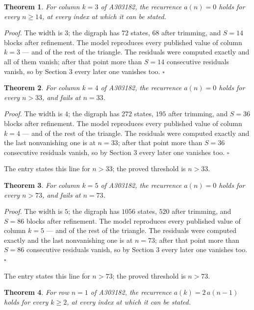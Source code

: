 \documentclass[11pt]{article}
\newtheorem{theorem}{Theorem}
\theoremstyle{definition}
\begin{document}
\begin{theorem} For column $k = 3$ of A303182, the recurrence $a(n) = 0$ holds for every $n \ge 14$, at every index at which it can be stated.\end{theorem}

{\itshape Proof.} The width is $3$; the digraph has $72$ states, $68$ after trimming, and $S = 14$ blocks after refinement. The model reproduces every published value of column $k = 3$ --- and of the rest of the triangle. The residuals were computed exactly and all of them vanish; after that point more than $S = 14$ consecutive residuals vanish, so by Section 3 every later one vanishes too. $\square$

\begin{theorem} For column $k = 4$ of A303182, the recurrence $a(n) = 0$ holds for every $n > 33$, and fails at $n = 33$.\end{theorem}

{\itshape Proof.} The width is $4$; the digraph has $272$ states, $195$ after trimming, and $S = 36$ blocks after refinement. The model reproduces every published value of column $k = 4$ --- and of the rest of the triangle. The residuals were computed exactly and the last nonvanishing one is at $n = 33$; after that point more than $S = 36$ consecutive residuals vanish, so by Section 3 every later one vanishes too. $\square$

The entry states this line for $n > 33$; the proved threshold is $n > 33$.

\begin{theorem} For column $k = 5$ of A303182, the recurrence $a(n) = 0$ holds for every $n > 73$, and fails at $n = 73$.\end{theorem}

{\itshape Proof.} The width is $5$; the digraph has $1056$ states, $520$ after trimming, and $S = 86$ blocks after refinement. The model reproduces every published value of column $k = 5$ --- and of the rest of the triangle. The residuals were computed exactly and the last nonvanishing one is at $n = 73$; after that point more than $S = 86$ consecutive residuals vanish, so by Section 3 every later one vanishes too. $\square$

The entry states this line for $n > 73$; the proved threshold is $n > 73$.

\begin{theorem} For row $n = 1$ of A303182, the recurrence $a(k) = 2\,a(n-1)$ holds for every $k \ge 2$, at every index at which it can be stated.\end{theorem}
\end{document}
